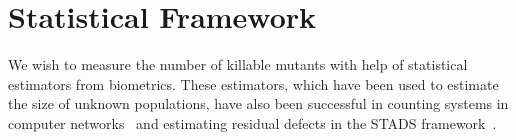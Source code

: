 \documentclass[sigconf,review,anonymous]{acmart}
\newcounter{todocounter}
\newcommand{\todo}[1]{\marginpar{$|$}\textcolor{red}{\stepcounter{todocounter}\footnote[\thetodocounter]{\textcolor{red}{\textbf{TODO }}\textit{#1}}}}
\newcommand{\Evosuite}{\textsc{EvoSuite}\xspace}
\newcommand{\original}{\textsc{Original}\xspace}
\newcommand{\EvosuiteRandom}{\textsc{Random}\xspace}
\newcommand{\EvosuiteDynamosa}{\textsc{DynaMOSA}\xspace}
\renewcommand{\todo}[1]{}
\begin{document}



\section{Statistical Framework}
\label{sec:mapping}
We wish to measure the number of killable mutants with help of statistical estimators from biometrics.
These estimators, which have been used to estimate the size of unknown populations, 
have also been successful in counting systems in
computer networks~\cite{accettura2015the} and
estimating residual defects in the STADS framework~\cite{bohme2018stads}.
\end{document}
